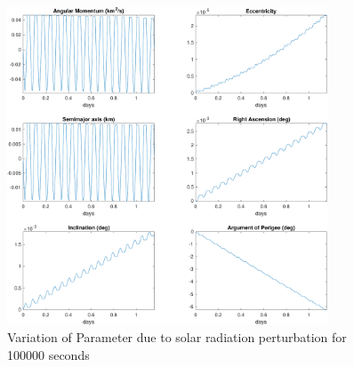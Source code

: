 \begin{figure}[H]
    \centering
    \includegraphics[width=0.85\textwidth]{../Figure/Q2/e_100000}
    \caption{Variation of Parameter due to solar radiation perturbation for 100000 seconds}
\end{figure}